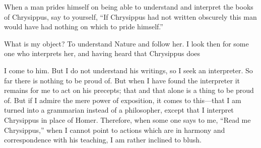 When a man prides  himself on being able to understand  and interpret the books
of Chrysippus, say to yourself, ``If  Chrysippus had not written obscurely this
man would have had nothing on which to pride himself.''

What is my  object? To understand Nature  and follow her. I look  then for some
one who interprets her, and having heard that Chrysippus does

I come to him. But I do not  understand his writings, so I seek an interpreter.
So far there is  nothing to be proud of. But when I  have found the interpreter
it remains for me to act on his precepts;  that and that alone is a thing to be
proud of. But if I admire the mere power of exposition, it comes to this---that
I am turned into a grammarian instead of a philosopher, except that I interpret
Chrysippus in place  of Homer. Therefore, when  some one says to  me, ``Read me
Chrysippus,''  when  I  cannot  point  to actions  which  are  in  harmony  and
correspondence with his teaching, I am rather inclined to blush.
